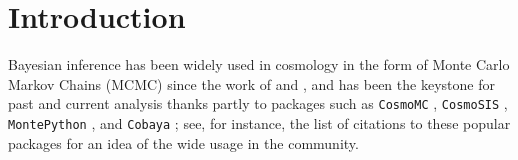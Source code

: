 \documentclass[twocolumn,twocolappendix,nofootinbib,iop]{openjournal}
\newcommand{\numpyro}{\texttt{NumPyro}}
\newcommand{\jaxcosmo}{\texttt{jax-cosmo}}
\newcommand{\jax}{\texttt{JAX}}
\begin{document}
\begin{abstract}


\end{abstract}

\maketitle




\section{Introduction}
Bayesian inference has been widely used in cosmology in the form of Monte Carlo Markov Chains (MCMC) since the work of \citet{2001ApJ...563L..95K} and \citet{2003MNRAS.341.1084R}, and has been the keystone for past and current analysis thanks partly to packages such as  \texttt{CosmoMC} \citep{2002PhRvD..66j3511L}, \texttt{CosmoSIS} \citep{2015A&C....12...45Z}, \texttt{MontePython} \citep{2019PDU....24..260B}, and \texttt{Cobaya} \citep{2019ascl.soft10019T,2021JCAP...05..057T}; see, for instance, the list of citations to these popular packages for an idea of the wide usage in the community. 
\end{document}
